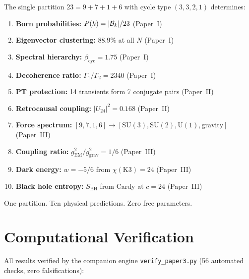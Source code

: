 \documentclass[12pt,a4paper]{article}
\theoremstyle{definition}\newtheorem{definition}[theorem]{Definition}
\theoremstyle{remark}\newtheorem{remark}[theorem]{Remark}
\begin{document}
The single partition $23 = 9 + 7 + 1 + 6$ with cycle type $(3,3,2,1)$
determines:

\begin{enumerate}
  \item \textbf{Born probabilities:} $P(k) = |\mathcal{B}_k|/23$ (Paper~I)
  \item \textbf{Eigenvector clustering:} $88.9\%$ at all $N$ (Paper~I)
  \item \textbf{Spectral hierarchy:} $\beta_{\mathrm{cyc}} = 1.75$ (Paper~I)
  \item \textbf{Decoherence ratio:} $\Gamma_1/\Gamma_2 = 2340$ (Paper~I)
  \item \textbf{PT protection:} 14 transients form 7 conjugate pairs (Paper~II)
  \item \textbf{Retrocausal coupling:} $|U_{24}|^2 = 0.168$ (Paper~II)
  \item \textbf{Force spectrum:} $[9,7,1,6] \to [\mathrm{SU}(3), \mathrm{SU}(2), \mathrm{U}(1), \text{gravity}]$ (Paper~III)
  \item \textbf{Coupling ratio:} $g_{\mathrm{EM}}^2/g_{\mathrm{grav}}^2 = 1/6$ (Paper~III)
  \item \textbf{Dark energy:} $w = -5/6$ from $\chi(\mathrm{K3}) = 24$ (Paper~III)
  \item \textbf{Black hole entropy:} $S_{\mathrm{BH}}$ from Cardy at $c = 24$ (Paper~III)
\end{enumerate}

One partition. Ten physical predictions. Zero free parameters.

\section{Computational Verification}
\label{sec:verification}

All results verified by the companion engine \texttt{verify\_paper3.py}
(56 automated checks, zero falsifications):
\end{document}
